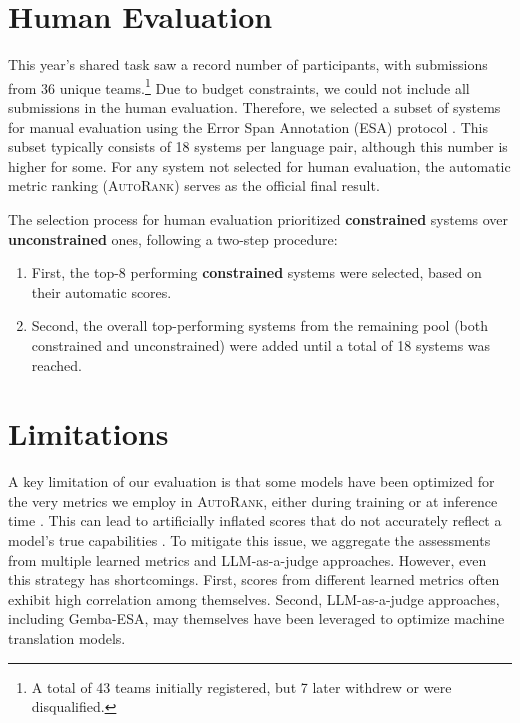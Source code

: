 \documentclass[11pt]{article}
\newcommand{\auto}{\textsc{AutoRank}}
\begin{document}
\section*{Human Evaluation}

This year's shared task saw a record number of participants, with submissions from 36 unique teams.\footnote{A total of 43 teams initially registered, but 7 later withdrew or were disqualified.} Due to budget constraints, we could not include all submissions in the human evaluation. Therefore, we selected a subset of systems for manual evaluation using the Error Span Annotation (ESA) protocol \citep{kocmi2024errorspanannotationbalanced}. This subset typically consists of 18 systems per language pair, although this number is higher for some. For any system not selected for human evaluation, the automatic metric ranking (\auto) serves as the official final result.

The selection process for human evaluation prioritized \textbf{constrained} systems over \textbf{unconstrained} ones, following a two-step procedure:
\begin{enumerate}
    \item First, the top-8 performing \textbf{constrained} systems were selected, based on their automatic scores.
    \item Second, the overall top-performing systems from the remaining pool (both constrained and unconstrained) were added until a total of 18 systems was reached.
\end{enumerate}








\section*{Limitations}


A key limitation of our evaluation is that some models have been optimized for the very metrics we employ in \auto, either during training or at inference time \cite{freitag-etal-2022-high, finkelstein2024mbr}. This can lead to artificially inflated scores that do not accurately reflect a model's true capabilities \cite{kovacs-etal-2024-mitigating}. To mitigate this issue, we aggregate the assessments from multiple learned metrics and LLM-as-a-judge approaches. However, even this strategy has shortcomings. First, scores from different learned metrics often exhibit high correlation among themselves. Second, LLM-as-a-judge approaches, including Gemba-ESA, may themselves have been leveraged to optimize machine translation models.
\end{document}
